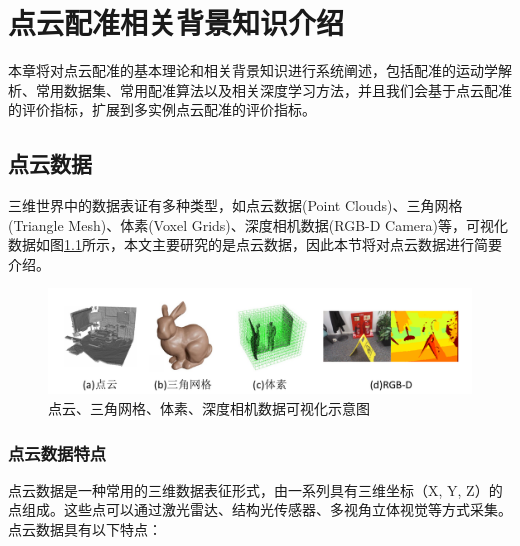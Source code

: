 %
%
%
%
%

\chapter{点云配准相关背景知识介绍}
本章将对点云配准的基本理论和相关背景知识进行系统阐述，包括配准的运动学解析、常用数据集、常用配准算法以及相关深度学习方法，并且我们会基于点云配准的评价指标，扩展到多实例点云配准的评价指标。

\section{点云数据}
三维世界中的数据表证有多种类型，如点云数据(Point Clouds)\cite{leberl2010point}、三角网格(Triangle Mesh)\cite{jiang2020local}、体素(Voxel Grids)\cite{guan2020voxel}、深度相机数据(RGB-D Camera)\cite{cruz2012kinect}等，可视化数据如图\ref{fig:3ddata}所示，本文主要研究的是点云数据，因此本节将对点云数据进行简要介绍。

\begin{figure}[ht]
    \vspace{-8mm}
    \includegraphics[width=\textwidth]{images/3ddata.pdf}
    \caption{点云、三角网格、体素、深度相机数据可视化示意图}
    \label{fig:3ddata}
    \vspace{-10mm}
\end{figure}


\subsection{点云数据特点}
点云数据是一种常用的三维数据表征形式，由一系列具有三维坐标（X, Y, Z）的点组成。这些点可以通过激光雷达、结构光传感器、多视角立体视觉等方式采集。点云数据具有以下特点：

